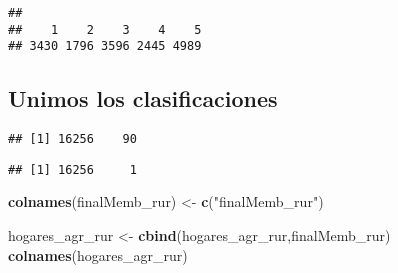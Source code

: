 \documentclass[11pt,]{article}
\newenvironment{Shaded}{\begin{snugshade}}{\end{snugshade}}
\newcommand{\KeywordTok}[1]{\textcolor[rgb]{0.13,0.29,0.53}{\textbf{#1}}}
\newcommand{\DecValTok}[1]{\textcolor[rgb]{0.00,0.00,0.81}{#1}}
\newcommand{\StringTok}[1]{\textcolor[rgb]{0.31,0.60,0.02}{#1}}
\newcommand{\OperatorTok}[1]{\textcolor[rgb]{0.81,0.36,0.00}{\textbf{#1}}}
\newcommand{\NormalTok}[1]{#1}
\begin{document}
\begin{verbatim}
## 
##    1    2    3    4    5 
## 3430 1796 3596 2445 4989
\end{verbatim}

\subsection{Unimos los
clasificaciones}\label{unimos-los-clasificaciones}

\begin{Shaded}
\end{Shaded}

\begin{verbatim}
## [1] 16256    90
\end{verbatim}

\begin{Shaded}
\end{Shaded}

\begin{verbatim}
## [1] 16256     1
\end{verbatim}

\begin{Shaded}
\begin{Highlighting}[]
\KeywordTok{colnames}\NormalTok{(finalMemb_rur) <-}\StringTok{ }\KeywordTok{c}\NormalTok{(}\StringTok{"finalMemb_rur"}\NormalTok{) }

\NormalTok{hogares_agr_rur <-}\StringTok{ }\KeywordTok{cbind}\NormalTok{(hogares_agr_rur,finalMemb_rur)}
\KeywordTok{colnames}\NormalTok{(hogares_agr_rur)  }
\end{Highlighting}
\end{Shaded}
\end{document}
